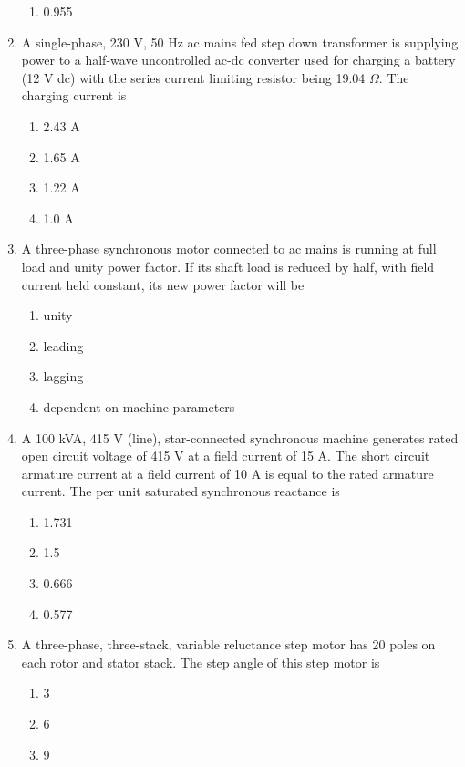 \documentclass[journal]{IEEEtran}
\begin{document}
\begin{enumerate}
\begin{enumerate}
     \item 0.955 \\
 \end{enumerate}
\item A single-phase, 230 V, 50 Hz ac mains fed step down transformer  is supplying power to a half-wave uncontrolled ac-dc converter used for charging a battery (12 V dc) with the series current limiting resistor being 19.04 $\Omega$. The charging current is
\begin{enumerate}
    \item 2.43 A
    \item 1.65 A
    \item 1.22 A
    \item 1.0 A \\
\end{enumerate}
\item A three-phase synchronous motor connected to ac mains is running at full load and unity power factor. If its shaft load is reduced by half, with field current held constant, its new power factor will be
\begin{enumerate}
    \item unity
    \item leading
    \item lagging
    \item dependent on machine parameters \\
\end{enumerate}
\item A 100 kVA, 415 V (line), star-connected synchronous machine generates rated open circuit voltage of 415 V at a field current of 15 A. The short circuit armature current at a field current of 10 A is equal to the rated armature current. The per unit saturated synchronous reactance is
\begin{enumerate}
    \item 1.731
    \item 1.5
    \item 0.666
    \item 0.577 \\
\end{enumerate}
\item A three-phase, three-stack, variable reluctance step motor has 20 poles on each rotor and stator stack. The step angle of this step motor is
\begin{enumerate}
    \item 3\degree
    \item 6\degree
    \item 9\degree

\end{enumerate}
\end{enumerate}
\end{document}
